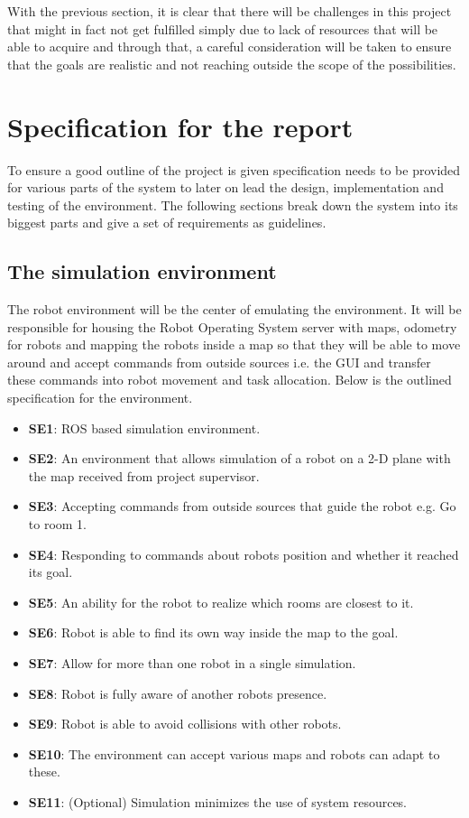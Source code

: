 \documentclass{report}
\begin{document}
      With the previous section, it is clear that there will be challenges in this project that might in fact not get fulfilled simply due to lack of resources that will be able to acquire and through that, a careful consideration will be taken to ensure that the goals are realistic and not reaching outside the scope of the possibilities.

  \chapter{Specification for the report}
    To ensure a good outline of the project is given specification needs to be provided for various parts of the system to later on lead the design, implementation and testing of the environment. The following sections break down the system into its biggest parts and give a set of requirements as guidelines.

    \section{The simulation environment}
      The robot environment will be the center of emulating the environment. It will be responsible for housing the Robot Operating System server with maps, odometry for robots and mapping the robots inside a map so that they will be able to move around and accept commands from outside sources i.e. the GUI and transfer these commands into robot movement and task allocation. Below is the outlined specification for the environment.

      \begin{itemize}
        \item \textbf{SE1}: ROS based simulation environment.
        \item \textbf{SE2}: An environment that allows simulation of a robot on a 2-D plane with the map received from project supervisor.
        \item \textbf{SE3}: Accepting commands from outside sources that guide the robot e.g. Go to room 1.
        \item \textbf{SE4}: Responding to commands about robots position and whether it reached its goal.
        \item \textbf{SE5}: An ability for the robot to realize which rooms are closest to it.
        \item \textbf{SE6}: Robot is able to find its own way inside the map to the goal.
        \item \textbf{SE7}: Allow for more than one robot in a single simulation.
        \item \textbf{SE8}: Robot is fully aware of another robots presence.
        \item \textbf{SE9}: Robot is able to avoid collisions with other robots.
        \item \textbf{SE10}: The environment can accept various maps and robots can adapt to these.
        \item \textbf{SE11}:  (Optional) Simulation minimizes the use of system resources.
      \end{itemize}
\end{document}

